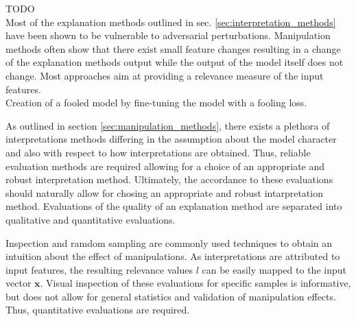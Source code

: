 TODO \\
Most of the explanation methods outlined in sec. \autoref{sec:interpretation_methods} have been shown to be vulnerable to adversarial perturbations. 
Manipulation methods often show that there exist small feature changes resulting in a change of the explanation methods output while the output of the model itself does not change. 
Most approaches aim at providing a relevance measure of the input features. \\



Creation of a fooled model by fine-tuning the model with a fooling loss. 


As outlined in section \autoref{sec:manipulation_methods}, there exists a plethora of interpretations methods differing in the assumption about the model character and also with respect to how interpretations are obtained. Thus, reliable evaluation methods are required allowing for a choice of an appropriate and robust interpretation method. Ultimately, the accordance to these evaluations should naturally allow for chosing an appropriate and robust intarpretation method.  
Evaluations of the quality of an explanation method are separated into qualitative and quantitative evaluations. 

Inspection and ramdom sampling are commonly used techniques to obtain an intuition about the effect of manipulations. 
As interpretations are attributed to input features, the resulting relevance values $l$ can be easily mapped to the input vector $\mathbf{x}$. Visual inspection of these evaluations for specific samples is informative, but does not allow for general statistics and validation of manipulation effects. Thus, quantitative evaluations are required. 


